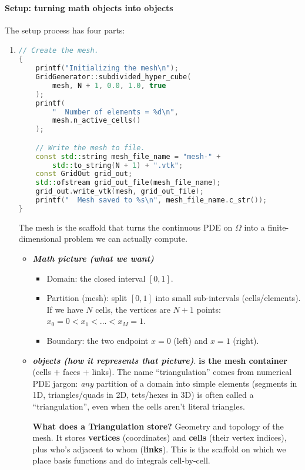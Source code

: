 \paragraph{Setup: turning math objects into  objects}

The setup process has four parts:
\begin{enumerate}
    \item {}
    \begin{lstlisting}[language=C++]
// Create the mesh.
{
    printf("Initializing the mesh\n");
    GridGenerator::subdivided_hyper_cube(
        mesh, N + 1, 0.0, 1.0, true
    );
    printf(
        "  Number of elements = %d\n",
        mesh.n_active_cells()
    );

    // Write the mesh to file.
    const std::string mesh_file_name = "mesh-" +
        std::to_string(N + 1) + ".vtk";
    const GridOut grid_out;
    std::ofstream grid_out_file(mesh_file_name);
    grid_out.write_vtk(mesh, grid_out_file);
    printf("  Mesh saved to %s\n", mesh_file_name.c_str());
}\end{lstlisting}
    The mesh is the scaffold that turns the continuous PDE on $\Omega$ into a finite-dimensional problem we can actually compute.
    \begin{itemize}
        \item \textbf{\emph{Math picture (what we want)}}
        \begin{itemize}
            \item Domain: the closed interval $\left[0,1\right]$.
            \item Partition (mesh): split $\left[0,1\right]$ into small sub-intervals (cells/elements). If we have $N$ cells, the vertices are $N+1$ points: $x_0=0 < x_1 < \dots < x_M=1$.
            \item Boundary: the two endpoint $x=0$ (left) and $x=1$ (right).
        \end{itemize}

        \item \textbf{\emph{ objects (how it represents that picture)}}.  \textbf{is the mesh container} (cells $+$ faces $+$ links). The name ``triangulation'' comes from numerical PDE jargon: \emph{any} partition of a domain into simple elements (segments in 1D, triangles/quads in 2D, tets/hexes in 3D) is often called a ``triangulation'', even when the cells aren't literal triangles.
        
        \textcolor{Green3}{ \textbf{What does a Triangulation store?}} Geometry and topology of the mesh. It stores \textbf{vertices} (coordinates) and \textbf{cells} (their vertex indices), plus who's adjacent to whom (\textbf{links}). This is the scaffold on which we place basis functions and do integrals cell-by-cell.


\end{itemize}
\end{enumerate}
